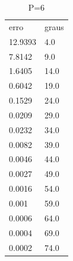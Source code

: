 \begin{table}[]
\centering
\caption{P=6}
\label{my-label}
\begin{tabular}{ll}
erro    & graus \\
12.9393 & 4.0   \\
7.8142  & 9.0   \\
1.6405  & 14.0  \\
0.6042  & 19.0  \\
0.1529  & 24.0  \\
0.0209  & 29.0  \\
0.0232  & 34.0  \\
0.0082  & 39.0  \\
0.0046  & 44.0  \\
0.0027  & 49.0  \\
0.0016  & 54.0  \\
0.001   & 59.0  \\
0.0006  & 64.0  \\
0.0004  & 69.0  \\
0.0002  & 74.0 
\end{tabular}
\end{table}